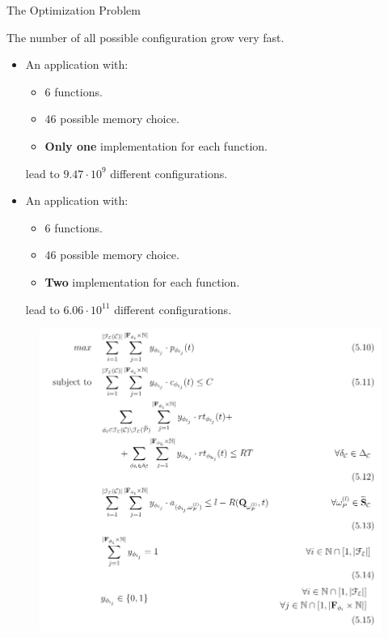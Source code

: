 \documentclass[13.5pt]{beamer}
\newcommand{\B}[1]{\textcolor{TorVergataColor}{\textbf{#1}}}
\begin{document}
\begin{frame}{The Optimization Problem}
	
	\begin{block}{}
		\centering
		The number of all possible configuration grow very fast.
	\end{block}
	
	\begin{itemize}
		\item An application with:
		\begin{itemize} 
			\item $6$ functions.
			\item $46$ possible memory choice.
			\item \B{Only one} implementation for each function.
		\end{itemize}
		
		lead to $9.47 \cdot 10^9$ different configurations.
		\vspace{\baselineskip}
		\item An application with:
		\begin{itemize} 
			\item $6$ functions.
			\item $46$ possible memory choice.
			\item \B{Two} implementation for each function.
		\end{itemize}
		
		lead to $6.06 \cdot 10^{11}$ different configurations.
	\end{itemize}
	
	
\end{frame}

\begin{frame}
	
\begin{figure}[h]
	\centering
	\includegraphics[width=\textwidth,height=0.8\columnwidth]{../Images/MMKPForSlide.png}
\end{figure}
	
	
\end{frame}
\end{document}

